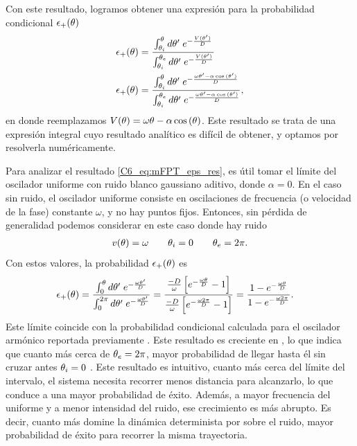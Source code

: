 \documentclass[./main.tex]{subfiles}
\begin{document}
Con este resultado, logramos obtener una expresión para la probabilidad condicional $\epsilon_{+}(\theta)$ 
\begin{align}
     \epsplus(\xx) & = \frac{\int_{\xxi}^\xx d\xx'\; e^{- \frac{V(\xx')}{D}}}{\int_{\xxi}^{\xxe} d\xx'\; e^{- \frac{V(\xx')}{D}}} \nonumber \\
     \epsplus(\xx) & = \frac{\int_{\xxi}^\xx d\xx'\; e^{- \frac{\omega \xx' - \alpha \cos{(\xx')}}{D}}}{\int_{\xxi}^{\xxe} d\xx'\; e^{- \frac{\omega \xx' - \alpha \cos{(\xx')}}{D}}},
     \label{C6_eq:mFPT_eps_res}
\end{align}
en donde reemplazamos $V(\theta) = \omega \theta - \alpha \cos{(\ensuremath{\theta})}$. Este resultado se trata de una expresión integral cuyo resultado analítico es difícil de obtener, y optamos por resolverla numéricamente.


Para analizar el resultado \ref{C6_eq:mFPT_eps_res}, es útil tomar el límite del oscilador uniforme con ruido blanco gaussiano aditivo, donde $\alpha = 0$. En el caso sin ruido, el oscilador uniforme consiste en oscilaciones de frecuencia (o velocidad de la fase) constante $\omega$, y no hay puntos fijos. Entonces, sin pérdida de generalidad podemos considerar en este caso donde hay ruido
\begin{align}
    v(\theta) = \omega \qquad 
    \theta_i = 0 \qquad \theta_e = 2 \pi.
    \label{C6_eq:mFPT_uniforme}
\end{align}
Con estos valores, la probabilidad $\epsilon_{+}(\theta)$ es
\begin{align}
     \epsilon_{+}(\theta) & = \frac{\int_{0}^\theta d\theta'\; e^{- \frac{\omega \theta'}{D}}}{\int_{0}^{2\pi} d\theta'\; e^{- \frac{\omega \theta'}{D}}}
      = \frac{\frac{-D}{\omega} \left[e^{- \frac{\omega \theta}{D}} - 1\right]}{\frac{-D}{\omega} \left[e^{- \frac{\omega 2\pi}{D}} - 1\right]} = \frac{ 1 - e^{- \frac{\omega \theta}{D}}}{1- e^{- \frac{\omega 2\pi}{D}}}.
\end{align}
Este límite coincide con la probabilidad condicional calculada para el oscilador armónico reportada previamente \cite{Redner2001}. Este resultado es creciente en \xx, lo que indica que cuanto más cerca de $\theta_e = 2\pi$, mayor probabilidad de llegar hasta él sin cruzar antes $\theta_i = 0$ . Este resultado es intuitivo, cuanto más cerca del límite \xxe del intervalo, el sistema necesita recorrer menos distancia para alcanzarlo, lo que conduce a una mayor probabilidad de éxito. Además, a mayor frecuencia del uniforme y a menor intensidad del ruido, ese crecimiento es más abrupto. Es decir, cuanto más domine la dinámica determinista por sobre el ruido, mayor probabilidad de éxito para recorrer la misma trayectoria. 
\end{document}
